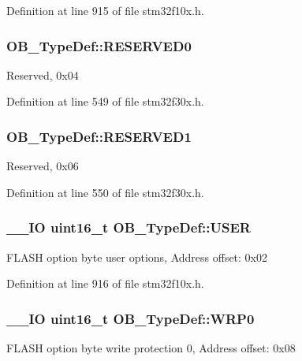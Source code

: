 Definition at line 915 of file stm32f10x.\-h.

\hypertarget{struct_o_b___type_def_a47e5d3b9fc64cb13b76935ce60798bf5}{
\subsubsection[{R\-E\-S\-E\-R\-V\-E\-D0}]{ O\-B\-\_\-\-Type\-Def\-::\-R\-E\-S\-E\-R\-V\-E\-D0}}\label{struct_o_b___type_def_a47e5d3b9fc64cb13b76935ce60798bf5}
Reserved, 0x04 

Definition at line 549 of file stm32f30x.\-h.

\hypertarget{struct_o_b___type_def_ac9f74fcb5eb1a543bc4ec85434bccb2f}{
\subsubsection[{R\-E\-S\-E\-R\-V\-E\-D1}]{ O\-B\-\_\-\-Type\-Def\-::\-R\-E\-S\-E\-R\-V\-E\-D1}}\label{struct_o_b___type_def_ac9f74fcb5eb1a543bc4ec85434bccb2f}
Reserved, 0x06 

Definition at line 550 of file stm32f30x.\-h.

\hypertarget{struct_o_b___type_def_ab0292062a80446c97dac24604bd8ed8e}{
\subsubsection[{U\-S\-E\-R}]{\setlength{\rightskip}{0pt plus 5cm}\-\_\-\-\_\-\-I\-O {\bf uint16\-\_\-t} O\-B\-\_\-\-Type\-Def\-::\-U\-S\-E\-R}}\label{struct_o_b___type_def_ab0292062a80446c97dac24604bd8ed8e}
F\-L\-A\-S\-H option byte user options, Address offset\-: 0x02 

Definition at line 916 of file stm32f10x.\-h.

\hypertarget{struct_o_b___type_def_acee93898f092604a871e52d64560e7a9}{
\subsubsection[{W\-R\-P0}]{\setlength{\rightskip}{0pt plus 5cm}\-\_\-\-\_\-\-I\-O {\bf uint16\-\_\-t} O\-B\-\_\-\-Type\-Def\-::\-W\-R\-P0}}\label{struct_o_b___type_def_acee93898f092604a871e52d64560e7a9}
F\-L\-A\-S\-H option byte write protection 0, Address offset\-: 0x08 

